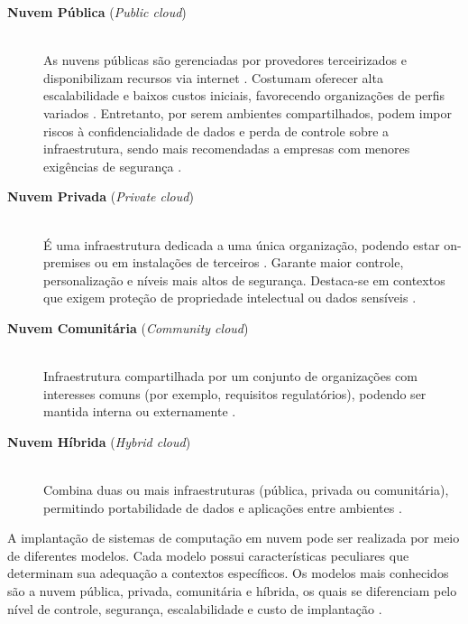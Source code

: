 \begin{description}
  \item[\textbf{Nuvem Pública} (\textit{Public cloud})] \hfill \\ As nuvens públicas são gerenciadas por provedores terceirizados e disponibilizam recursos via internet \cite{carroll2011}. Costumam oferecer alta escalabilidade e baixos custos iniciais, favorecendo organizações de perfis variados \cite{amajuoyi2024}. Entretanto, por serem ambientes compartilhados, podem impor riscos à confidencialidade de dados e perda de controle sobre a infraestrutura, sendo mais recomendadas a empresas com menores exigências de segurança \cite{sathya2023}.

  \item[\textbf{Nuvem Privada} (\textit{Private cloud})] \hfill \\ É uma infraestrutura dedicada a uma única organização, podendo estar on-premises ou em instalações de terceiros \cite{mell2011}. Garante maior controle, personalização e níveis mais altos de segurança. Destaca-se em contextos que exigem proteção de propriedade intelectual ou dados sensíveis \cite{swapna2023}.

  \item[\textbf{Nuvem Comunitária} (\textit{Community cloud})] \hfill \\ Infraestrutura compartilhada por um conjunto de organizações com interesses comuns (por exemplo, requisitos regulatórios), podendo ser mantida interna ou externamente \cite{mell2011}.

  \item[\textbf{Nuvem Híbrida} (\textit{Hybrid cloud})] \hfill \\ Combina duas ou mais infraestruturas (pública, privada ou comunitária), permitindo portabilidade de dados e aplicações entre ambientes \cite{mell2011}.
\end{description}
 
A implantação de sistemas de computação em nuvem pode ser realizada por meio de diferentes modelos. Cada modelo possui características peculiares que determinam sua adequação a contextos específicos. Os modelos mais conhecidos são a nuvem pública, privada, comunitária e híbrida, os quais se diferenciam pelo nível de controle, segurança, escalabilidade e custo de implantação \cite{mell2011}.

